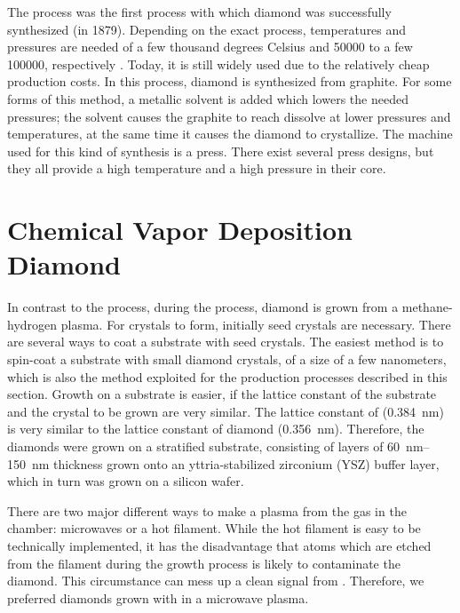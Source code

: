 	The \HPHT process was the first process with which diamond was successfully synthesized (in 1879).
	Depending on the exact process, temperatures and pressures are needed of a few thousand degrees Celsius and  \num{50000} to a few \num{100000}, respectively \cite{davis1993diamond}.
	Today, it is still widely used due to the relatively cheap production costs\cite{wikiSyntheticDiamond}.
	In this process, diamond is synthesized from graphite.
	For some forms of this method, a metallic solvent is added which lowers the needed pressures; the solvent causes the graphite to reach dissolve at lower pressures and temperatures, at the same time it causes the diamond to crystallize.
	The machine used for this kind of synthesis is a press.
	There exist several press designs, but they all provide a high temperature and a high pressure in their core.


	\section[CVD]{Chemical Vapor Deposition Diamond}

	In contrast to the \HPHT process,  during the \cvd process, diamond is grown from a methane-hydrogen plasma.
	For crystals to form, initially seed crystals are necessary.
	There are several ways to coat a substrate with seed crystals. 
	The easiest method is to spin-coat a substrate with small diamond crystals, of a size of a few nanometers, which is also the method exploited for the production processes described in this section.
	Growth on a substrate is easier, if the lattice constant of the substrate and the crystal to be grown are very similar.
	The lattice constant of \ir (\SI{0.384}{nm}\cite{Arblaster2010}) is very similar to the lattice constant of diamond (\SI{0.356}{nm}\cite{Davis1993}).
	Therefore, the diamonds were grown on a stratified substrate, consisting of \ir layers of \SIrange{60}{150}{nm} thickness grown onto an yttria-stabilized zirconium (YSZ) buffer layer, which in turn was grown on a silicon wafer.

	There are two major different ways to make a plasma from the gas in the chamber: microwaves or a hot filament.
	While the hot filament is easy to be technically implemented, it has the disadvantage that atoms which are etched from the filament during the growth process is likely to contaminate the diamond.
	This circumstance can mess up a clean signal from \sivs.
	Therefore, we preferred diamonds grown with in a microwave plasma.

